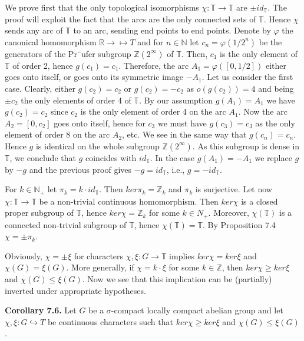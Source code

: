 \documentclass[12pt]{article}
\begin{document}
 We prove first that the only topological isomorphisms $\chi : \mathbb{T} \to \mathbb{T}$ are $\pm id_{\mathbb{T}}$. The proof will exploit the
fact that the arcs are the only connected sets of $\mathbb{T}$. Hence $\chi$ sends any arc of $\mathbb{T}$ to an arc, sending end points to
end points. Denote by $\varphi$ the canonical homomorphism $\mathbb{R} \to \mapsto{T}$ and for $n \in \mathbb{N}$ let $c_n = \varphi(1/2^n)$ be the generators
of the Pr¨ufer subgroup $\mathbb{Z}(2^{\infty})$ of $\mathbb{T}$. Then, $c_1$ is the only element of $\mathbb{T}$ of order 2, hence $g(c_1) = c_1$. Therefore,
the arc $A_1 = \varphi([0, 1/2])$ either goes onto itself, or goes onto its symmetric image $-A_1$. Let us consider the first
case. Clearly, either $g(c_2) = c_2$ or $g(c_2) = -c_2$ as $o(g(c_2)) = 4$ and being $\pm c_2$ the only elements of order 4 of $\mathbb{T}$.
By our assumption $g(A_1) = A_1$ we have $g(c_2) = c_2$ since $c_2$ is the only element of order 4 on the arc $A_1$. Now
the arc $A_2 = [0, c_2]$ goes onto itself, hence for $c_3$ we must have $g(c_3) = c_3$ as the only element of order 8 on the
arc $A_2$, etc. We see in the same way that $g(c_n) = c_n$. Hence $g$ is identical on the whole subgroup $\mathbb{Z}(2^{\infty})$. As
this subgroup is dense in $\mathbb{T}$, we conclude that $g$ coincides with $id_{\mathbb{T}}$. In the case $g(A_1) = -A_1$ we replace $g$ by
$-g$ and the previous proof gives $-g = id_{\mathbb{T}}$, i.e., $g = -id_{\mathbb{T}}$.


    For $k \in \mathbb{N}_+$ let $\pi_k = k · id_{\mathbb{T}}$. Then $ker \pi_k = \mathbb{Z}_k$ and $\pi_k$ is surjective. Let now $χ : \mathbb{T} \to \mathbb{T}$ be a non-trivial
continuous homomorphism. Then $ker \chi$ is a closed proper subgroup of $\mathbb{T}$, hence $ker \chi = \mathbb{Z}_k$ for some $k \in N_+$.
Moreover, $\chi(\mathbb{T})$ is a connected non-trivial subgroup of $\mathbb{T}$, hence $\chi(\mathbb{T}) = \mathbb{T}$. By Proposition 7.4 $\chi = \pm \pi_k$.


    Obviously, $\chi = \pm \xi$ for characters $\chi, \xi : G \to \mathbb{T}$ implies $ker \chi = ker \xi$ and $\chi (G) = \xi (G)$. More generally,
if $\chi = k · \xi$ for some $k \in \mathbb{Z}$, then $ker \chi \geq ker \xi$ and $\chi (G) \leq \xi (G)$. Now we see that this implication can be
(partially) inverted under appropriate hypotheses.


\textbf{Corollary 7.6.} Let $G$ be a $\sigma$-compact locally compact abelian group and let $\chi, \xi : G \hookrightarrow T$ be continuous
characters such that $ker \chi \geq ker \xi$ and $\chi (G) \leq \xi (G)$.
\end{document}
